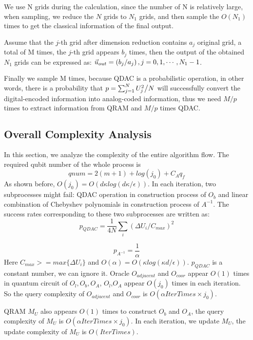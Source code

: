 \documentclass[%
 reprint,
 amsmath,amssymb,
pra,
]{revtex4-1}
\begin{document}
We use N grids during the calculation,
since the number of N is relatively large,
when sampling, we reduce the $N$ grids to $N_1$ grids, 
and then sample the $O(N_1)$ times to get the classical information of the final output.

Assume that the $j$-th grid after dimension reduction contains $a_j$ original grid,
a total of M times, the $j$-th grid appears $b_j$ times, then the output of the obtained $N_1$ grids can be expressed as: ${\vec u_{out}} = \left( {{{{b_j}} \mathord{\left/
{\vphantom {{{b_j}} {{a_j}}}} \right. \kern-\nulldelimiterspace} {{a_j}}}} \right),j = 0,1, \cdots ,{N_1} - 1$.

Finally we sample M times,
because QDAC is a probabilistic operation,
in other words, 
there is a probability that $p = \sum\nolimits_{j = 1}^N {{{U_j^2} \mathord{\left/
{\vphantom {{U_j^2} N}} \right. \kern-\nulldelimiterspace} N}} $ will successfully convert 
the digital-encoded information into analog-coded information,
thus we need $M/p$ times to extract information from QRAM and $M/p$ times QDAC.



\subsection{Overall Complexity Analysis}

In this section, we analyze the complexity of the entire algorithm flow. The required qubit number of the whole process is 
$$
qnum=2(m+1)+log(j_0)+C_Aq_f
$$
As shown before, $O(j_0)=O(d\kappa log(d\kappa/\epsilon))$.
In each iteration, two subprocesses might fail: QDAC operation in construction process of $O_b$ and linear combination of Chebyshev polynomials in construction process of $A^{-1}$. The success rates corresponding to these two subprocesses are written as:
$$
p_{QDAC}=\frac{1}{4N}\sum_i{(\Delta U_i/C_{max})^2}
$$

$$
p_{A^{-1}}=\frac{1}{\alpha}
$$
Here $C_{max}>=max\{\Delta U_i\}$ and $O(\alpha)=O(\kappa log(\kappa d/\epsilon))$. $p_{QDAC}$ is a constant number, we can ignore it.
Oracle $O_{adjacent}$ and $O_{coor}$ appear $O(1)$ times in quantum circuit of $O_l,O_b,O_A$, $O_l$,$O_A$ appear $O(j_0)$ times in each iteration. So the query complexity of $O_{adjacent}$ and $O_{coor}$ is $O(\alpha IterTimes\times j_0)$.

QRAM $M_U$ also appears $O(1)$ times to construct $O_b$ and $O_A$, the query complexity of $M_U$ is $O(\alpha IterTimes\times j_0)$. In each iteration, we update $M_U$, the update complexity of $M_U$ is $O(IterTimes)$.
\end{document}
